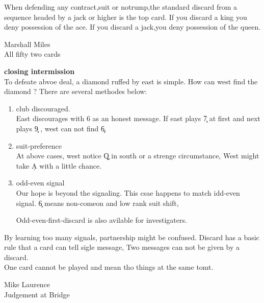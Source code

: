\vspace{0.5cm}

When defending any contract,suit or notrump,the
standard discard from a sequence headed by a jack or higher is
the top card. If you discard a king you deny possession of the ace.
If you discard a jack,you deny possession of the queen.
\begin{flushright}{
Marshall Miles\\
All fifty two cards}
\end{flushright}

\vspace{0.5cm}
{\bf closing intermission}\\

To defeate abvoe deal, a diamond ruffed by east is simple.
How can west find the diamond ? There are several methodes below:

\begin{enumerate}
\item{ club discouraged.\\
East discourages with 6 as an honest message. If east plays \c 7 at first and
next plays \c 9 , west can not find \c 6.

}

\item{ suit-preference\\
At above cases, west notice \c Q in south or a strenge circumstance,
West might take \d A with a little chance.
}
\item{ odd-even signal\\
Our hope is beyond the signaling. This csae happens to match idd-even
signal. \c 6 means non-comeon and low rank suit shift,

Odd-even-first-discard is also avilable for investigaters.
}



\end{enumerate}

By learning too many signals, partnership might be confused.
Discard has a basic rule that a card can tell sigle message,
Two messages can not be given by a discard.\\

One card cannot be played and mean tho things at the same tomt.
\begin{flushright}{
Mike Laurence\\
Judgement at Bridge}
\end{flushright}



